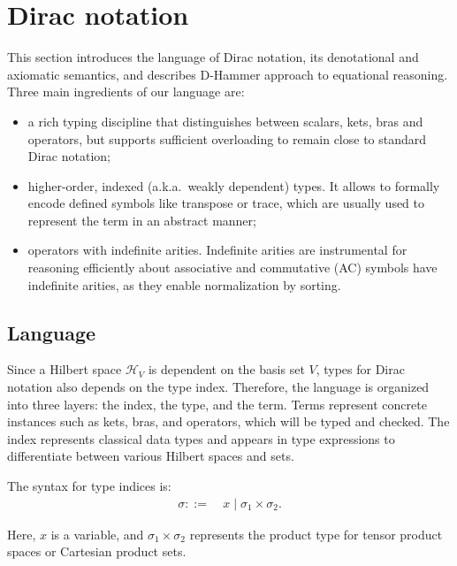 
\section{Dirac notation}
This section introduces the language of Dirac notation, its
denotational and axiomatic semantics, and describes D-Hammer approach
to equational reasoning. Three main ingredients of our language are:
\begin{itemize}
\item a rich typing discipline that distinguishes between scalars,
  kets, bras and operators, but supports sufficient overloading to
  remain close to standard Dirac notation;
\item higher-order, indexed (a.k.a.\, weakly dependent) types. It allows
  to formally encode defined symbols like transpose or trace, which
  are usually used to represent the term in an abstract manner;
\item operators with indefinite arities. Indefinite arities are
  instrumental for reasoning efficiently about associative and
  commutative (AC) symbols have indefinite arities, as they enable
  normalization by sorting.
\end{itemize}

\subsection{Language}
Since a Hilbert space $\mathcal{H}_V$ is dependent on the basis set
$V$, types for Dirac notation also depends on the type index.
Therefore, the language is organized into three layers: the index, the
type, and the term.  Terms represent concrete instances such as kets,
bras, and operators, which will be typed and checked. The index
represents classical data types and appears in type expressions to
differentiate between various Hilbert spaces and sets.

\begin{definition}
    The syntax for type indices is:
    \begin{align*}
        \sigma ::=\ & x \mid \sigma_1 \times \sigma_2.
    \end{align*}
\end{definition}
Here, \( x \) is a variable, and \( \sigma_1 \times \sigma_2 \) represents the product type for tensor product spaces or Cartesian product sets.

